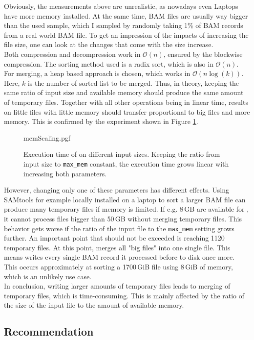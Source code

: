 Obviously, the measurements above are unrealistic, as nowadays even Laptops have more memory installed. At the same time, BAM files are usually way bigger than the used sample, which I sampled by randomly taking 1\% of BAM records from a real world BAM file. To get an impression of the impacts of increasing the file size, one can look at the changes that come with the size increase. \\
Both compression and decompression work in $\mathcal{O}(n)$, ensured by the blockwise compression. The sorting method used is a radix sort, which is also in $\mathcal{O}(n)$. For merging, a heap based approach is chosen, which works in $\mathcal{O}(n \log(k))$. Here, $k$ is the number of sorted list to be merged. Thus, in theory, keeping the same ratio of input size and available memory should produce the same amount of temporary files. Together with all other operations being in linear time, results on little files with little memory should transfer proportional to big files and more memory. This is confirmed by the experiment shown in Figure \ref{fig:memScaling}.\\
\begin{figure}
        {memScaling.pgf}
    \caption{Execution time of \sort on different input sizes. Keeping the ratio from input size to \texttt{max\_mem} constant, the execution time grows linear with increasing both parameters.}
    \label{fig:memScaling}
\end{figure}
However, changing only one of these parameters has different effects. Using SAMtools for example locally installed on a laptop to sort a larger BAM file can produce many temporary files if memory is limited. If e.g. 8\,GB are available for \sort, it cannot process files bigger than 50\,GB without merging temporary files. This behavior gets worse if the ratio of the input file to the \texttt{max\_mem} setting grows further. An important point that should not be exceeded is reaching 1120 temporary files. At this point, \sort merges all "big files" into one single file. This means \sort writes every single BAM record it processed before to disk once more. This occurs approximately at sorting a 1700\,GiB file using 8\,GiB of memory, which is an unlikely use case. \\
In conclusion, writing larger amounts of temporary files leads to merging of temporary files, which is time-consuming. This is mainly affected by the ratio of the size of the input file to the amount of available memory.

\subsection{Recommendation}

